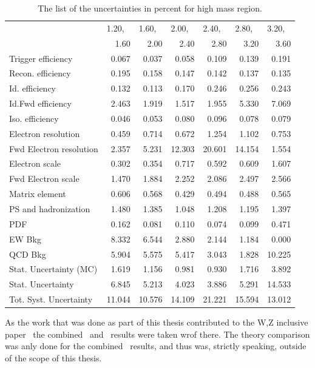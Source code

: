 \begin{table}
\centering
\begin{tabular}{l r r r r r r}
\hline
   & \multicolumn{1}{l}{1.20,} & \multicolumn{1}{l}{1.60,} & \multicolumn{1}{l}{2.00,}
   & \multicolumn{1}{l}{2.40,} & \multicolumn{1}{l}{2.80,} & \multicolumn{1}{l}{3.20,}  \\
   & 1.60  & 2.00  & 2.40  & 2.80  & 3.20  & 3.60  \\
\hline
Trigger efficiency            & 0.067 & 0.037 & 0.058 & 0.109 & 0.139 & 0.191  \\
Recon. efficiency             & 0.195 & 0.158 & 0.147 & 0.142 & 0.137 & 0.135  \\
Id. efficiency                & 0.132 & 0.113 & 0.170 & 0.246 & 0.256 & 0.243  \\
Id.Fwd efficiency             & 2.463 & 1.919 & 1.517 & 1.955 & 5.330 & 7.069  \\
Iso. efficiency               & 0.046 & 0.053 & 0.080 & 0.096 & 0.078 & 0.079  \\
Electron resolution           & 0.459 & 0.714 & 0.672 & 1.254 & 1.102 & 0.753  \\
Fwd Electron resolution       & 2.357 & 5.231 & 12.303 & 20.601 & 14.154 & 1.554  \\
Electron scale                & 0.302 & 0.354 & 0.717 & 0.592 & 0.609 & 1.607  \\
Fwd Electron scale            & 1.470 & 1.884 & 2.252 & 2.086 & 2.497 & 2.566  \\
Matrix element                & 0.606 & 0.568 & 0.429 & 0.494 & 0.488 & 0.565  \\
PS and hadronization          & 1.480 & 1.385 & 1.048 & 1.208 & 1.195 & 1.397  \\
PDF                           & 0.162 & 0.081 & 0.110 & 0.074 & 0.099 & 0.471  \\
EW Bkg                        & 8.332 & 6.544 & 2.880 & 2.144 & 1.184 & 0.000  \\
QCD Bkg                       & 5.904 & 5.575 & 5.417 & 3.043 & 1.828 & 10.225  \\
\hline
Stat. Uncertainty (MC)        & 1.619 & 1.156 & 0.981 & 0.930 & 1.716 & 3.892  \\
Stat. Uncertainty             & 6.845 & 5.213 & 4.023 & 3.886 & 5.291 & 14.533  \\
\hline
Tot. Syst. Uncertainty        & 11.044 & 10.576 & 14.109 & 21.221 & 15.594 & 13.012 \\
\hline
\end{tabular}
\caption{The list of the uncertainties in percent for high mass region.}
\label{tab:Zee_unc_list_high}
\end{table}
As the work that was done as part of this thesis contributed to the W,Z inclusive paper~\cite{lib:wz2011} the combined \Zee\ and \Zll\ results were taken wrof there. The theory comparison was anly done for the combined \Zll\ results, and thus was, strictly speaking, outside of the scope of this thesis.

